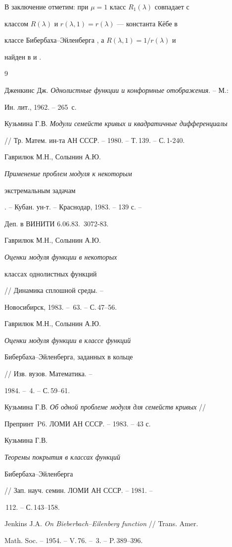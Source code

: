 В заключение отметим: при $\mu=1$ класс $R_1(\lambda)$ совпадает с 


классом $R(\lambda)$ и $r(\lambda,1)=r(\lambda)$ --- константа К\"ебе в 


классе Бибербаха--Эйленберга \cite{8}, а $R(\lambda,1)=1/r(\lambda)$ и 


найден в \cite{3} и \cite{7}. 


 


\begin{thebibliography}{9} 


 




Дженкинс Дж. {\em Однолистные функции и конформные отображения}. -- М.: 


Ин. лит., 1962. -- 265~с. 




Кузьмина Г.В. {\em Модули семейств кривых и квадратичные дифференциалы} 


// Тр. Матем. ин-та АН СССР. -- 1980. -- Т.\,139. -- С.\,1-240. 




Гаврилюк М.Н., Солынин А.Ю. {\em Применение проблем модуля к некоторым 


экстремальным задачам}. -- Кубан. ун-т. -- Краснодар, 1983. -- 139 с. --


Деп. в ВИНИТИ 6.06.83. \No\,3072-83. 




Гаврилюк М.Н., Солынин А.Ю. {\em Оценки модуля функции в некоторых 


классах однолистных функций} // Динамика сплошной среды. -- 


Новосибирск, 1983. -- \No\,63. -- С.\,47--56. 




Гаврилюк М.Н., Солынин А.Ю. {\em Оценки модуля функции в классе функций 


Бибербаха--Эйленберга, заданных в кольце} // Изв. вузов. Математика. -- 


1984. -- \No\,4. -- С.\,59--61. 




Кузьмина Г.В. {\em Об одной проблеме модуля для семейств кривых} // 


Препринт \No\,P6. ЛОМИ АН СССР. -- 1983. -- 43 с. 




Кузьмина Г.В. {\em Теоремы покрытия в классах функций 


Бибербаха--Эйленберга} // Зап. науч. семин. ЛОМИ АН СССР. -- 1981. -- 


\No\,112. -- С.\,143--158. 




Jenkins J.A. {\em On Bieberbach--Eilenberg function} // Trans. Amer. 


Math. Soc. -- 1954. -- V.\,76. -- \No\,3. -- P.\,389--396. 


 


\end{thebibliography} 


